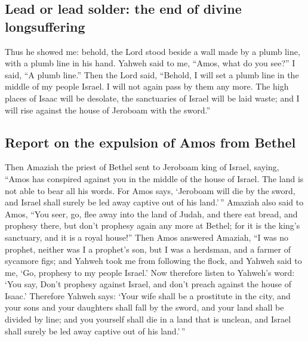 \hypertarget{lead-or-lead-solder-the-end-of-divine-longsuffering}{%
\subsection{Lead or lead solder: the end of divine
longsuffering}\label{lead-or-lead-solder-the-end-of-divine-longsuffering}}

 Thus he showed me: behold, the Lord stood beside a wall
made by a plumb line, with a plumb line in his hand. 
Yahweh said to me, ``Amos, what do you see?'' I said, ``A plumb line.''
Then the Lord said, ``Behold, I will set a plumb line in the middle of
my people Israel. I will not again pass by them any more. 
The high places of Isaac will be desolate, the sanctuaries of Israel
will be laid waste; and I will rise against the house of Jeroboam with
the sword.''

\hypertarget{report-on-the-expulsion-of-amos-from-bethel}{%
\subsection{Report on the expulsion of Amos from
Bethel}\label{report-on-the-expulsion-of-amos-from-bethel}}

 Then Amaziah the priest of Bethel sent to Jeroboam king
of Israel, saying, ``Amos has conspired against you in the middle of the
house of Israel. The land is not able to bear all his words.
 For Amos says, `Jeroboam will die by the sword, and
Israel shall surely be led away captive out of his land.'\,''
 Amaziah also said to Amos, ``You seer, go, flee away
into the land of Judah, and there eat bread, and prophesy there,
 but don't prophesy again any more at Bethel; for it is
the king's sanctuary, and it is a royal house!''  Then
Amos answered Amaziah, ``I was no prophet, neither was I a prophet's
son, but I was a herdsman, and a farmer of sycamore figs;
 and Yahweh took me from following the flock, and Yahweh
said to me, `Go, prophesy to my people Israel.'  Now
therefore listen to Yahweh's word: `You say, Don't prophesy against
Israel, and don't preach against the house of Isaac.' 
Therefore Yahweh says: `Your wife shall be a prostitute in the city, and
your sons and your daughters shall fall by the sword, and your land
shall be divided by line; and you yourself shall die in a land that is
unclean, and Israel shall surely be led away captive out of his
land.'\,''

